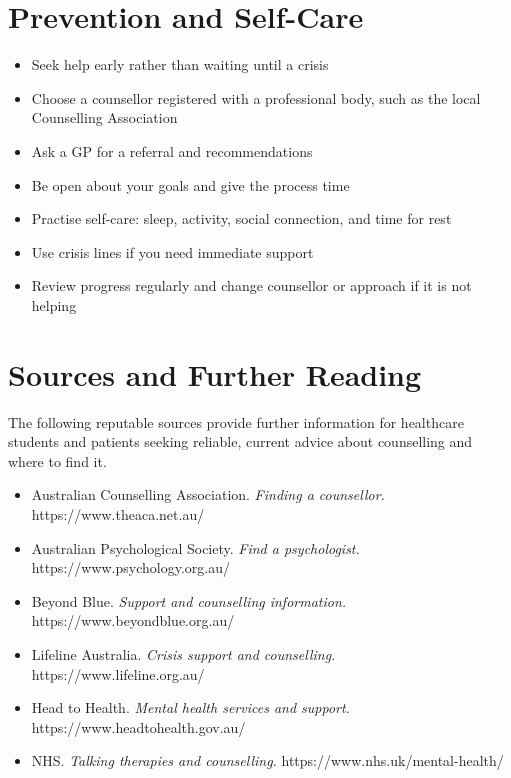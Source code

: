 \section*{Prevention and Self-Care}
\begin{itemize}
    \item Seek help early rather than waiting until a crisis
    \item Choose a counsellor registered with a professional body, such as the local Counselling Association
    \item Ask a GP for a referral and recommendations
    \item Be open about your goals and give the process time
    \item Practise self-care: sleep, activity, social connection, and time for rest
    \item Use crisis lines if you need immediate support
    \item Review progress regularly and change counsellor or approach if it is not helping
\end{itemize}

\section*{Sources and Further Reading}
The following reputable sources provide further information for healthcare students and patients seeking reliable, current advice about counselling and where to find it.

\begin{itemize}
    \item Australian Counselling Association. \textit{Finding a counsellor.} https://www.theaca.net.au/
    \item Australian Psychological Society. \textit{Find a psychologist.} https://www.psychology.org.au/
    \item Beyond Blue. \textit{Support and counselling information.} https://www.beyondblue.org.au/
    \item Lifeline Australia. \textit{Crisis support and counselling.} https://www.lifeline.org.au/
    \item Head to Health. \textit{Mental health services and support.} https://www.headtohealth.gov.au/
    \item NHS. \textit{Talking therapies and counselling.} https://www.nhs.uk/mental-health/
\end{itemize}
